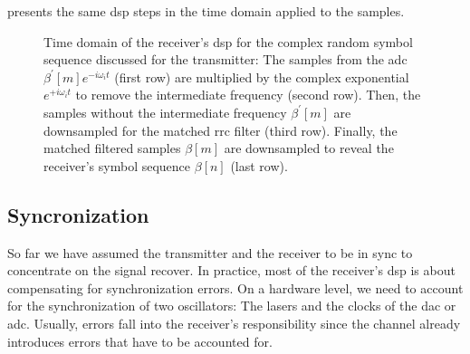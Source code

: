  presents the same \gls{dsp} steps in the time domain applied to the samples.
\begin{figure}[htb]
	\centering
	
	\caption{Time domain of the receiver's \gls{dsp} for the complex random symbol sequence discussed for the transmitter: The samples from the \gls{adc} $\beta^\prime[m]e^{-i\omega_it}$ (first row) are multiplied by the complex exponential $e^{+i\omega_it}$ to remove the intermediate frequency (second row). Then, the samples without the intermediate frequency $\beta^\prime[m]$ are downsampled for the matched \gls{rrc} filter (third row). Finally, the matched filtered samples $\beta[m]$ are downsampled to reveal the receiver's symbol sequence $\beta[n]$ (last row).}\label{fig:receiver_time}
\end{figure}

\FloatBarrier
\subsection{Syncronization}

\cite[p.~359]{Proakis2007} %
\cite{Godard1978} %
\cite{Huang2015,Qi2015,Soh2015} %

So far we have assumed the transmitter and the receiver to be in sync to concentrate on the signal recover.
In practice, most of the receiver's \gls{dsp} is about compensating for synchronization errors.
On a hardware level, we need to account for the synchronization of two oscillators:
The lasers and the clocks of the \gls{dac} or \gls{adc}.
Usually, errors fall into the receiver's responsibility since the channel already introduces errors that have to be accounted for.

